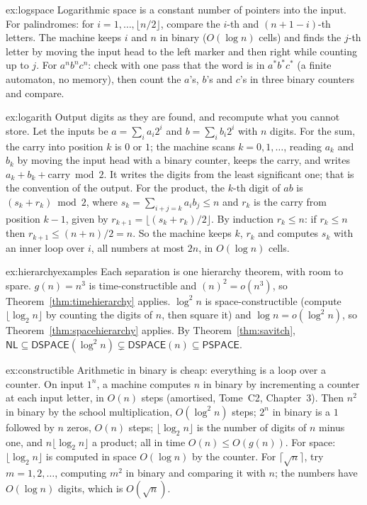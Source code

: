 \begin{solution}{ex:logspace}
\idea Logarithmic space is a constant number of pointers into the input.
\writeup For palindromes: for $i=1,\dots,\lfloor n/2\rfloor$, compare the $i$-th and $(n+1-i)$-th letters. The machine keeps $i$ and $n$ in binary ($O(\log n)$ cells) and finds the $j$-th letter by moving the input head to the left marker and then right while counting up to $j$. For $a^nb^nc^n$: check with one pass that the word is in $a^*b^*c^*$ (a finite automaton, no memory), then count the $a$'s, $b$'s and $c$'s in three binary counters and compare.
\end{solution}

\begin{solution}{ex:logarith}
\idea Output digits as they are found, and recompute what you cannot store.
\writeup Let the inputs be $a=\sum_ia_i2^i$ and $b=\sum_ib_i2^i$ with $n$ digits. For the sum, the carry into position $k$ is $0$ or $1$; the machine scans $k=0,1,\dots$, reading $a_k$ and $b_k$ by moving the input head with a binary counter, keeps the carry, and writes $a_k+b_k+\text{carry}\bmod2$. It writes the digits from the least significant one; that is the convention of the output. For the product, the $k$-th digit of $ab$ is $(s_k+r_k)\bmod2$, where $s_k=\sum_{i+j=k}a_ib_j\le n$ and $r_k$ is the carry from position $k-1$, given by $r_{k+1}=\lfloor(s_k+r_k)/2\rfloor$. By induction $r_k\le n$: if $r_k\le n$ then $r_{k+1}\le(n+n)/2=n$. So the machine keeps $k$, $r_k$ and computes $s_k$ with an inner loop over $i$, all numbers at most $2n$, in $O(\log n)$ cells.
\end{solution}

\begin{solution}{ex:hierarchyexamples}
\idea Each separation is one hierarchy theorem, with room to spare.
\writeup $g(n)=n^3$ is time-constructible and $(n)^2=o(n^3)$, so Theorem~\ref{thm:timehierarchy} applies. $\log^2n$ is space-constructible (compute $\lfloor\log_2n\rfloor$ by counting the digits of $n$, then square it) and $\log n=o(\log^2n)$, so Theorem~\ref{thm:spacehierarchy} applies. By Theorem~\ref{thm:savitch}, $\mathsf{NL}\subseteq\mathsf{DSPACE}(\log^2n)\subsetneq\mathsf{DSPACE}(n)\subseteq\mathsf{PSPACE}$.
\end{solution}

\begin{solution}{ex:constructible}
\idea Arithmetic in binary is cheap: everything is a loop over a counter.
\writeup On input $1^n$, a machine computes $n$ in binary by incrementing a counter at each input letter, in $O(n)$ steps (amortised, Tome~C2, Chapter~3). Then $n^2$ in binary by the school multiplication, $O(\log^2n)$ steps; $2^n$ in binary is a $1$ followed by $n$ zeros, $O(n)$ steps; $\lfloor\log_2n\rfloor$ is the number of digits of $n$ minus one, and $n\lfloor\log_2n\rfloor$ a product; all in time $O(n)\le O(g(n))$. For space: $\lfloor\log_2n\rfloor$ is computed in space $O(\log n)$ by the counter. For $\lceil\sqrt n\rceil$, try $m=1,2,\dots$, computing $m^2$ in binary and comparing it with $n$; the numbers have $O(\log n)$ digits, which is $O(\sqrt n)$.
\end{solution}

